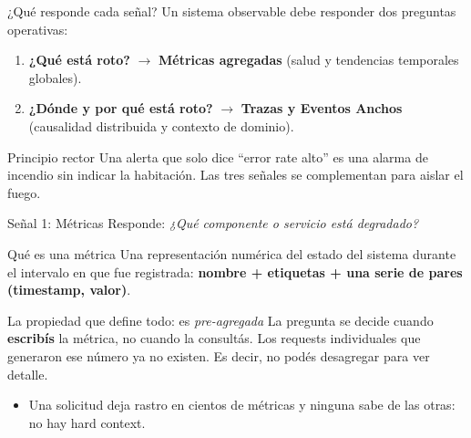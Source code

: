 \documentclass[institutional,screen,none]{../cls/ua-engineering-v6-beamer}
\begin{document}

\begin{frame}{¿Qué responde cada señal?}
Un sistema observable debe responder dos preguntas operativas:
\begin{enumerate}
\item \textbf{¿Qué está roto?} $\longrightarrow$ \textbf{Métricas agregadas} (salud y tendencias temporales globales).
\item \textbf{¿Dónde y por qué está roto?} $\longrightarrow$ \textbf{Trazas y Eventos Anchos} (causalidad distribuida y contexto de dominio).
\end{enumerate}

\pause

\begin{alertblock}{Principio rector}
Una alerta que solo dice ``error rate alto'' es una alarma de incendio sin indicar la habitación. Las tres señales se complementan para aislar el fuego.
\end{alertblock}
\end{frame}

\begin{frame}{Señal 1: Métricas}
Responde: \emph{¿Qué componente o servicio está degradado?}

\begin{block}{Qué es una métrica}
Una representación numérica del estado del sistema durante el intervalo en que fue registrada: \textbf{nombre + etiquetas + una serie de pares (timestamp, valor)}.
\end{block}

\pause

\begin{alertblock}{La propiedad que define todo: es \emph{pre-agregada}}
La pregunta se decide cuando \textbf{escribís} la métrica, no cuando la consultás. Los requests individuales que generaron ese número ya no existen. Es decir, no podés desagregar para ver detalle.
\end{alertblock}

\pause

\begin{itemize}
\item Una solicitud deja rastro en cientos de métricas y ninguna sabe de las otras: no hay hard context.
\end{itemize}
\end{frame}
\end{document}
